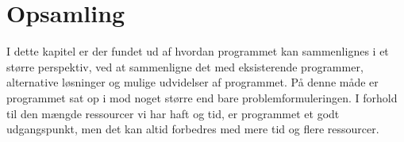 \section*{Opsamling}
I dette kapitel er der fundet ud af hvordan programmet kan sammenlignes i et større perspektiv, ved at sammenligne det med eksisterende programmer, alternative løsninger og mulige udvidelser af programmet. På denne måde er programmet sat op i mod noget større end bare problemformuleringen. I forhold til den mængde ressourcer vi har haft og tid, er programmet et godt udgangspunkt, men det kan altid forbedres med mere tid og flere ressourcer. 